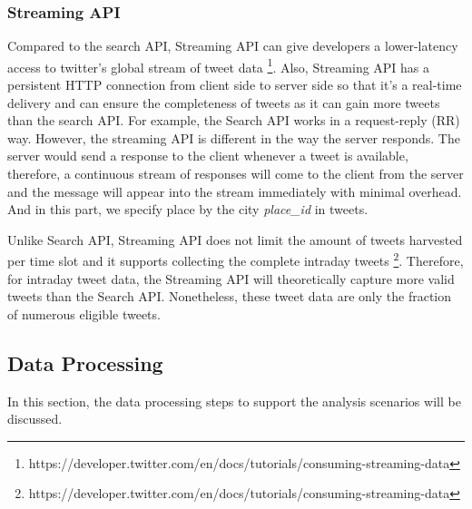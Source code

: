 \documentclass{article}
\begin{document}
\subsubsection{Streaming API}
Compared to the search API, Streaming API can give developers a lower-latency access to twitter’s global stream of tweet data \footnote{https://developer.twitter.com/en/docs/tutorials/consuming-streaming-data}. Also, Streaming API has a persistent HTTP connection from client side to server side so that it’s a real-time delivery and can ensure the completeness of tweets as it can gain more tweets than the search API. For example, the Search API works in a request-reply (RR) way. However, the streaming API is different in the way the server responds. The server would send a response to the client whenever a tweet is available, therefore, a continuous stream of responses will come to the client from the server and the message will appear into the stream immediately with minimal overhead. And in this part, we specify place by the city \textit{place\_id} in tweets.

Unlike Search API, Streaming API does not limit the amount of tweets harvested per time slot and it supports collecting the complete intraday tweets
\footnote{https://developer.twitter.com/en/docs/tutorials/consuming-streaming-data}. Therefore, for intraday tweet data, the Streaming API will theoretically capture more valid tweets than the Search API. Nonetheless, these tweet data are only the fraction of numerous eligible tweets.

\subsection{Data Processing}
In this section, the data processing steps to support the analysis scenarios will be discussed.
\end{document}
